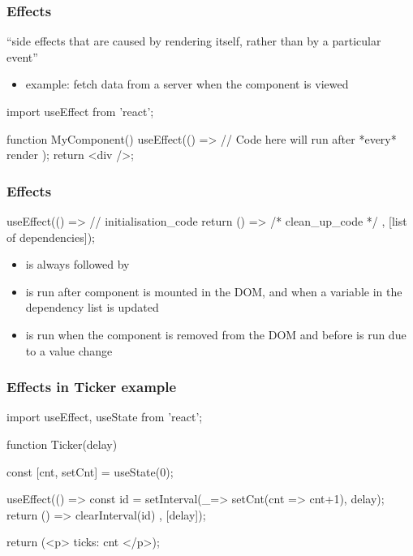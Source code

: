 \begin{frame}[fragile] \frametitle{Effects}
``side effects that are caused by rendering itself, rather than by a particular event''
\begin{itemize}
  \item example: fetch data from a server when the component is viewed
\end{itemize}
\vspace{5mm}
\begin{CodeBox}{}
import { useEffect } from 'react';

function MyComponent() {
  useEffect(() => {
    // Code here will run after *every* render
  });
  return <div />;
}
\end{CodeBox}
\end{frame}

\begin{frame}[fragile] \frametitle{Effects}
\begin{CodeBox}{}
useEffect(() => {
  // initialisation_code
  return 
    () => {/* clean_up_code */}
  }, [list of dependencies]);
\end{CodeBox}
\vspace{5mm}
\begin{itemize}
  \item {} is always followed by 
  \item {} is run after component is mounted in the DOM, and when a variable in the dependency list is updated
  \item {} is run when the component is removed from the DOM and before  is run due to a value change
\end{itemize}
\end{frame}

\begin{frame}[fragile] \frametitle{Effects in Ticker example}
\begin{CodeBox}{}
import { useEffect, useState } from 'react';

function Ticker({delay}) {
  const [cnt, setCnt] = useState(0);
  
  useEffect(() => {
    const id = setInterval(_=> setCnt(cnt => cnt+1), delay);
    return () => {clearInterval(id)}
  }, [delay]);
  
  return (<p> ticks: {cnt} </p>);
}
\end{CodeBox}
\end{frame}

